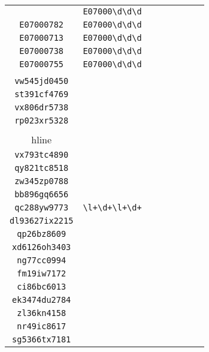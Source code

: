 \begin{longtable}{cccccccc}
\begin{tabular}{ll}
    \verb|E07000177| & \verb|E07000\d\d\d|\\
\verb|E07000782| & \verb|E07000\d\d\d|\\
\verb|E07000713| & \verb|E07000\d\d\d|\\
\verb|E07000738| & \verb|E07000\d\d\d|\\
\verb|E07000755| & \verb|E07000\d\d\d|
\end{tabular}
\\\midrule 
\begin{tabular}{l}
    \verb|kt831qh3476|\\
\verb|vw545jd0450|\\
\verb|st391cf4769|\\
\verb|vx806dr5738|\\
\verb|rp023xr5328|\\
\\hline\\
\verb|vx793tc4890|\\
\verb|qy821tc8518|\\
\verb|zw345zp0788|\\
\verb|bb896gq6656|\\
\verb|qc288yw9773|
\end{tabular}

&
\verb|\l+\d+\l+\d+|
&

\begin{tabular}{l}
    \verb|\l\l\d\d(\d)*\l\l\d\d\d\d|\\
\verb|dl93627ix2215|\\
\verb|qp26bz8609|\\
\verb|xd6126oh3403|\\
\verb|ng77cc0994|\\
\verb|fm19iw7172|
\end{tabular}

&

\begin{tabular}{l}
    \verb|\l\l\d\d(\d)*\l\l\d\d\d\d|\\
\verb|ci86bc6013|\\
\verb|ek3474du2784|\\
\verb|zl36kn4158|\\
\verb|nr49ic8617|\\
\verb|sg5366tx7181|
\end{tabular}

&


\end{longtable}
